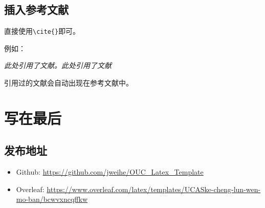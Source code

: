\documentclass[12pt,hyperref,a4paper,UTF8]{ctexart}
\begin{document}
%
%
%
%
%
%

\subsection{插入参考文献}
直接使用\verb|\cite{}|即可。

例如：


   \textit{ 此处引用了文献\cite{0Isaac}。此处引用了文献\cite{2016The}}


引用过的文献会自动出现在参考文献中。

\section{写在最后}
\subsection{发布地址}
\begin{itemize}
    \item Github: \url{https://github.com/jweihe/OUC_Latex_Template}
    \item Overleaf:  \url{https://www.overleaf.com/latex/templates/UCASke-cheng-lun-wen-mo-ban/bcwvxncqffkw}
\end{itemize}


\end{document}
